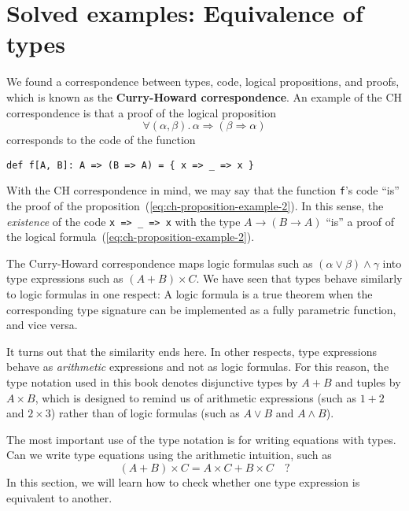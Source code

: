 \section{Solved examples: Equivalence of types}

We found a correspondence between types, code, logical propositions,
and proofs, which is known as the \textbf{Curry-Howard correspondence}.
An example of the CH correspondence is that a proof of the logical
proposition
\begin{equation}
\forall(\alpha,\beta).\,\alpha\Rightarrow\left(\beta\Rightarrow\alpha\right)\label{eq:ch-proposition-example-2}
\end{equation}
corresponds to the code of the function 
\begin{lstlisting}
def f[A, B]: A => (B => A) = { x => _ => x }
\end{lstlisting}
With the CH correspondence in mind, we may say that the function \lstinline!f!'s
code ``is'' the proof of the proposition~(\ref{eq:ch-proposition-example-2}).
In this sense, the \emph{existence} of the code \lstinline!x => _ => x!
with the type $A\rightarrow(B\rightarrow A)$ ``is'' a proof of
the logical formula~(\ref{eq:ch-proposition-example-2}).

The Curry-Howard correspondence maps logic formulas such as $(\alpha\vee\beta)\wedge\gamma$
into type expressions such as $\left(A+B\right)\times C$. We have
seen that types behave similarly to logic formulas in one respect:
A logic formula is a true theorem when the corresponding type signature
can be implemented as a fully parametric function, and vice versa.

It turns out that the similarity ends here. In other respects, type
expressions behave as \emph{arithmetic} expressions and not as logic
formulas. For this reason, the type notation used in this book denotes
disjunctive types by $A+B$ and tuples by $A\times B$, which is designed
to remind us of arithmetic expressions (such as $1+2$ and $2\times3$)
rather than of logic formulas (such as $A\vee B$ and $A\wedge B$). 

The most important use of the type notation is for writing equations
with types. Can we write type equations using the arithmetic intuition,
such as 
\begin{equation}
\left(A+B\right)\times C=A\times C+B\times C\quad?\label{eq:ch-example-distributive}
\end{equation}
In this section, we will learn how to check whether one type expression
is equivalent to another.

